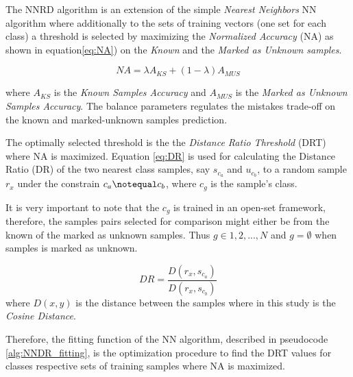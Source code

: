 \documentclass[runningheads]{llncs}
\begin{document}
The NNRD algorithm is an extension of the simple \textit{Nearest Neighbors} NN algorithm where additionally to the sets of training vectors (one set for each class) a threshold is selected by maximizing the \textit{Normalized Accuracy} (NA) as shown in equation\ref{eq:NA}) on the \textit{Known} and the \textit{Marked as Unknown samples}.

\begin{equation} \label{eq:NA}
    NA = \lambda A_{KS} + (1 - \lambda) A_{MUS}
\end{equation}

\noindent
where $A_{KS}$ is the \textit{Known Samples Accuracy} and $A_{MUS}$ is the \textit{Marked as Unknown Samples Accuracy}. The balance parameters \lambda regulates the mistakes trade-off on the known and marked-unknown samples prediction.

The optimally selected threshold is the the \textit{Distance Ratio Threshold} (DRT) where NA is maximized. Equation \ref{eq:DR} is used for calculating the Distance Ratio (DR) of the two nearest class samples, say $s_{c_{a}}$ and $u_{c_{b}}$, to a random sample $r_{x}$ under the constrain $c_{a} \notequal c_{b}$, where $c_{g}$ is the sample's class.

It is very important to note that the $c_{g}$ is trained in an open-set framework, therefore, the samples pairs selected for comparison might either be from the known of the marked as unknown samples. Thus $g \in {1,2,...,N}$ and $g = \emptyset$ when samples is marked as unknown.

\begin{equation} \label{eq:DR}
    DR = \frac{D(r_{x}, s_{c_{a}})}{D(r_{x}, s_{c_{b}})}
\end{equation}
\noindent
where $D(x,y)$ is the distance between the samples where in this study is the \textit{Cosine Distance}.

Therefore, the fitting function of the NN algorithm, described in pseudocode \ref{alg:NNDR_fitting}, is the optimization procedure to find the DRT values for classes respective sets of training samples where NA is maximized.

\hfill \break
\end{document}
